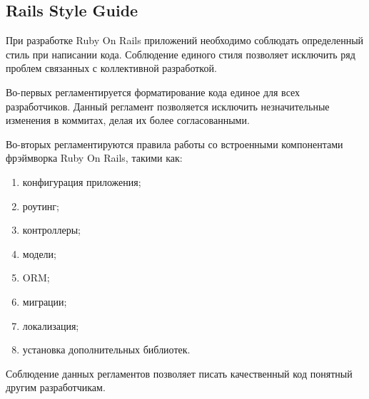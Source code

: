 \subsection{Rails Style Guide}
При разработке Ruby On Rails приложений необходимо соблюдать определенный стиль при написании кода. Соблюдение единого стиля позволяет исключить ряд проблем связанных с коллективной разработкой.

Во-первых регламентируется форматирование кода единое для всех разработчиков.
Данный регламент позволяется исключить незначительные изменения в коммитах,
делая их более согласованными.

Во-вторых регламентируются правила работы со встроенными компонентами фрэймворка
Ruby On Rails, такими как:
\begin{enumerate}
  \item конфигурация приложения;
  \item роутинг;
  \item контроллеры;
  \item модели;
  \item ORM;
  \item миграции;
  \item локализация;
  \item установка дополнительных библиотек.   
\end{enumerate}

Соблюдение данных регламентов позволяет писать качественный код понятный другим
разработчикам.
